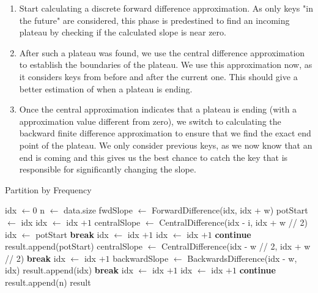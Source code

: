 \begin{enumerate}
    \item Start calculating a discrete forward difference approximation. As only keys "in the future" are considered, this phase is predestined to find an incoming plateau by checking if the calculated slope is near zero.
    \item After such a plateau was found, we use the central difference approximation to establish the boundaries of the plateau. We use this approximation now, as it considers keys from before and after the current one. This should give a better estimation of when a plateau is ending.
    \item Once the central approximation indicates that a plateau is ending (with a approximation value different from zero), we switch to calculating the backward finite difference approximation to ensure that we find the exact end point of the plateau. We only consider previous keys, as we now know that an end is coming and this gives us the best chance to catch the key that is responsible for significantly changing the slope.
\end{enumerate}


\begin{algorithm}
\caption{Partition by Frequency}
\begin{algorithmic}[1] \label{algo:freq}
    \STATE idx $\leftarrow 0$
    \STATE n $\leftarrow$ data.size
        \STATE fwdSlope $\leftarrow$ ForwardDifference(idx, idx + w)
            \STATE potStart $\leftarrow$ idx
            \STATE idx $\leftarrow$ idx $+ 1$
                \STATE centralSlope $\leftarrow$ CentralDifference(idx - i, idx + w // 2)
                    \STATE idx $\leftarrow$ potStart
                    \STATE\textbf{break}
                \ENDIF
                \STATE idx $\leftarrow$ idx $+ 1$
            \ENDFOR
                \STATE idx $\leftarrow$ idx $+ 1$
                \STATE \textbf{continue}
            \ENDIF
            \STATE result.append(potStart)
                \STATE centralSlope $\leftarrow$ CentralDifference(idx - w // 2, idx + w // 2)
                    \STATE\textbf{break}
                \ENDIF
                \STATE idx $\leftarrow$ idx $+ 1$
            \ENDWHILE
                \STATE backwardSlope $\leftarrow$ BackwardsDifference(idx - w, idx)
                    \STATE result.append(idx)
                    \STATE\textbf{break}
                \ENDIF
                \STATE idx $\leftarrow$ idx $+ 1$
            \ENDWHILE
        \ELSE
            \STATE idx $\leftarrow$ idx $+ 1$
            \STATE \textbf{continue}
        \ENDIF
    \ENDWHILE
    \STATE result.append(n)
    \RETURN result
\end{algorithmic}
\end{algorithm}

